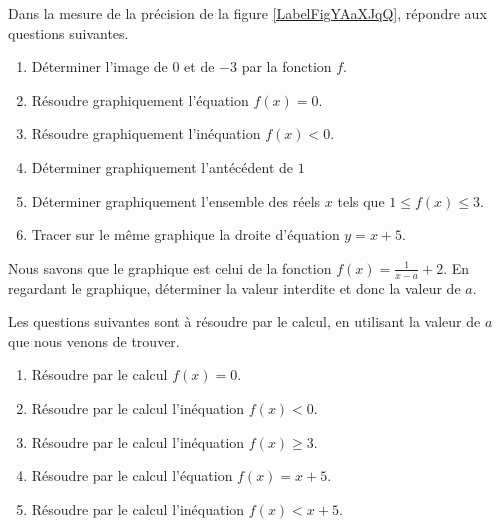 
\begin{exercice}\label{exosmath-0316}

Dans la mesure de la précision de la figure \ref{LabelFigYAaXJqQ}, répondre aux questions suivantes.
\begin{enumerate}
    \item
        Déterminer l'image de \( 0\) et de \( -3\) par la fonction \( f\).
    \item
        Résoudre graphiquement l'équation \( f(x)=0\).
    \item
        Résoudre graphiquement l'inéquation \( f(x)<0\).
    \item
        Déterminer graphiquement l'antécédent de \( 1\)
    \item
        Déterminer graphiquement l'ensemble des réels \( x\) tels que \( 1\leq f(x)\leq 3\).
    \item
        Tracer sur le même graphique la droite d'équation \( y=x+5\).
\end{enumerate}
\newcommand{\CaptionFigYAaXJqQ}{Le graphe de la fonction \( f\) étudiée dans l'exercice \ref{exosmath-0316}.}


Nous savons que le graphique est celui de la fonction \( f(x)=\frac{1}{ x-a }+2\). En regardant le graphique, déterminer la valeur interdite et donc la valeur de \( a\).

Les questions suivantes sont à résoudre par le calcul, en utilisant la valeur de \( a\) que nous venons de trouver.
\begin{enumerate}
    \item
        Résoudre par le calcul \( f(x)=0\).
    \item
        Résoudre par le calcul l'inéquation \( f(x)<0\).
    \item
        Résoudre par le calcul l'inéquation \( f(x)\geq 3\).
    \item
        Résoudre par le calcul l'équation \( f(x)=x+5\).
    \item
        Résoudre par le calcul l'inéquation \( f(x)<x+5\).
\end{enumerate}

\end{exercice}

